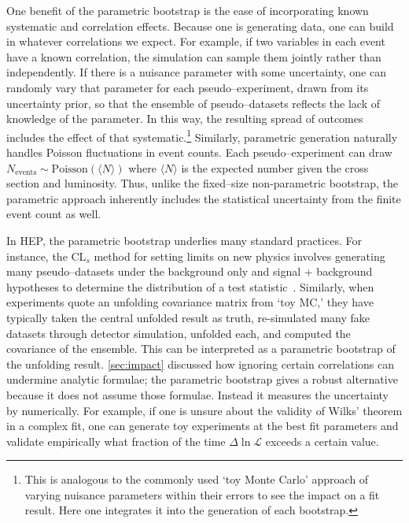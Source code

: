             One benefit of the parametric bootstrap is the ease of incorporating known systematic and correlation effects.
            Because one is generating data, one can build in whatever correlations we expect.
            For example, if two variables in each event have a known correlation, the simulation can sample them jointly rather than independently.
            If there is a nuisance parameter with some uncertainty, one can randomly vary that parameter for each pseudo--experiment, drawn from its uncertainty prior, so that the ensemble of pseudo--datasets reflects the lack of knowledge of the parameter.
            In this way, the resulting spread of outcomes includes the effect of that systematic.\footnote{
                This is analogous to the commonly used `toy Monte Carlo' approach of varying nuisance parameters within their errors to see the impact on a fit result.
                Here one integrates it into the generation of each bootstrap.
            }
            Similarly, parametric generation naturally handles Poisson fluctuations in event counts.
            Each pseudo--experiment can draw $N_{\text{events}} \sim \text{Poisson}(\langle N \rangle)$ where $\langle N \rangle$ is the expected number given the cross section and luminosity.
            Thus, unlike the fixed--size non-parametric bootstrap, the parametric approach inherently includes the statistical uncertainty from the finite event count as well.

            In HEP, the parametric bootstrap underlies many standard practices.
            For instance, the CL$_s$ method for setting limits on new physics involves generating many pseudo--datasets under the background only and signal + background hypotheses to determine the distribution of a test statistic~\cite{Read:2002hq, Harel:2011jyp, mandelkern_setting_2002, giere_allan_1977, Zech:1988un, birnbaum_foundations_1962, birnbaum_neyman-pearson_1977, Cowan2011AsymptoticPhysics, Fraser:2004ty, cousins_negatively_2011}.
            Similarly, when experiments quote an unfolding covariance matrix from `toy MC,' they have typically taken the central unfolded result as truth, re-simulated many fake datasets through detector simulation, unfolded each, and computed the covariance of the ensemble.
            This can be interpreted as a parametric bootstrap of the unfolding result.
            \cref{sec:impact} discussed how ignoring certain correlations can undermine analytic formulae;
            the parametric bootstrap gives a robust alternative because it does not assume those formulae.
            Instead it measures the uncertainty by numerically.
            For example, if one is unsure about the validity of Wilks' theorem in a complex fit, one can generate toy experiments at the best fit parameters and validate empirically what fraction of the time $\Delta\ln\mathcal{L}$ exceeds a certain value.

